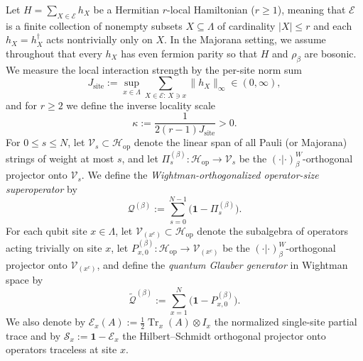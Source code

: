 \documentclass[11pt,a4paper]{article}
\numberwithin{equation}{section}
\theoremstyle{plain}
\theoremstyle{definition}
\newcommand{\Hop}{\mathcal{H}_{\mathrm{op}}}
\newcommand{\Tr}{\operatorname{Tr}}
\begin{document}
Let $H = \sum_{X\in\mathcal{E}} h_X$ be a Hermitian $r$-local Hamiltonian ($r\ge 1$), meaning that $\mathcal{E}$ is a finite collection of nonempty subsets $X\subseteq\Lambda$ of cardinality $|X|\le r$ and each $h_X = h_X^\dagger$ acts nontrivially only on $X$. In the Majorana setting, we assume throughout that every $h_X$ has even fermion parity so that $H$ and $\rho_\beta$ are bosonic. We measure the local interaction strength by the per-site norm sum
\begin{equation}\label{eq:intro-Jsite}
  J_{\mathrm{site}} := \sup_{x\in\Lambda} \sum_{X\in\mathcal{E}:\, X\ni x} \|h_X\|_\infty \in (0,\infty),
\end{equation}
and for $r\ge 2$ we define the inverse locality scale
\begin{equation}\label{eq:intro-kappa}
  \kappa := \frac{1}{2(r-1)J_{\mathrm{site}}} > 0.
\end{equation}
For $0\le s\le N$, let $\mathcal{V}_s \subset \Hop$ denote the linear span of all Pauli (or Majorana) strings of weight at most $s$, and let $\Pi_s^{(\beta)}:\Hop\to\mathcal{V}_s$ be the $(\cdot|\cdot)_\beta^W$-orthogonal projector onto $\mathcal{V}_s$. We define the \emph{Wightman-orthogonalized operator-size superoperator} by
\begin{equation}\label{eq:intro-Qbeta}
  \mathcal{Q}^{(\beta)} := \sum_{s=0}^{N-1}\bigl(\mathbf{1}-\Pi_s^{(\beta)}\bigr).
\end{equation}
For each qubit site $x\in\Lambda$, let $\mathcal{V}_{(x^c)}\subset\Hop$ denote the subalgebra of operators acting trivially on site $x$, let $P_{x,0}^{(\beta)}:\Hop\to\mathcal{V}_{(x^c)}$ be the $(\cdot|\cdot)_\beta^W$-orthogonal projector onto $\mathcal{V}_{(x^c)}$, and define the \emph{quantum Glauber generator} in Wightman space by
\begin{equation}\label{eq:intro-Qtilde}
  \widetilde{\mathcal{Q}}^{(\beta)} := \sum_{x=1}^N \bigl(\mathbf{1} - P_{x,0}^{(\beta)}\bigr).
\end{equation}
We also denote by $\mathcal{E}_x(A) := \frac{1}{2}\Tr_x(A)\otimes I_x$ the normalized single-site partial trace and by $\mathcal{S}_x := \mathbf{1} - \mathcal{E}_x$ the Hilbert--Schmidt orthogonal projector onto operators traceless at site $x$.
\end{document}
